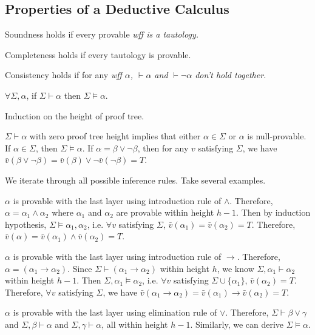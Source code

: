\documentclass{article}
\begin{document}
\QED



\subsection{Properties of a Deductive Calculus}

	Soundness holds if every provable \it{wff} is a tautology.
	
	Completeness holds if every tautology is provable.

	Consistency holds if for any \it{wff} $\alpha$, $\vdash \alpha$ and $\vdash \neg\alpha$ don't hold together.

	$\forall \Sigma, \alpha$, if $\Sigma \vdash \alpha$ then $\Sigma \vDash \alpha$.
	
\Proof
	Induction on the height of proof tree.
	
	 $\Sigma \vdash \alpha$ with zero proof tree height implies that either $\alpha \in \Sigma$ or $\alpha$ is null-provable. If $\alpha \in \Sigma$, then $\Sigma \vDash \alpha$. If $\alpha = \beta \lor \neg\beta$, then for any $v$ satisfying $\Sigma$, we have $\bar{v}(\beta \lor\neg\beta)=\bar{v}(\beta) \lor \neg \bar{v}(\neg\beta) = T$.
	
	 We iterate through all possible inference rules. Take several examples.
	
		 $\alpha$ is provable with the last layer using introduction rule of $\land$. Therefore, $\alpha = \alpha_1 \land \alpha_2$ where $\alpha_1$ and $\alpha_2$ are provable within height $h-1$. Then by induction hypothesis, $\Sigma \vDash \alpha_1, \alpha_2$, i.e. $\forall v$ satisfying $\Sigma$, $\bar{v}(\alpha_1)=\bar{v}(\alpha_2)=T$. Therefore, $\bar{v}(\alpha)=\bar{v}(\alpha_1) \land \bar{v}(\alpha_2)=T$.
		
		 $\alpha$ is provable with the last layer using introduction rule of $\to$. Therefore, $\alpha = (\alpha_1 \to \alpha_2)$. Since $\Sigma \vdash (\alpha_1 \to \alpha_2)$ within height $h$, we know $\Sigma, \alpha_1 \vdash \alpha_2$ within height $h-1$. Then $\Sigma, \alpha_1 \vDash \alpha_2$, i.e. $\forall v$ satisfying $\Sigma \cup \{\alpha_1\}$, $\bar{v}(\alpha_2)=T$. Therefore, $\forall v$ satisfying $\Sigma$, we have $\bar{v}(\alpha_1 \to \alpha_2) = \bar{v}(\alpha_1) \to \bar{v}(\alpha_2) = T$.
		
		 $\alpha$ is provable with the last layer using elimination rule of $\lor$. Therefore, $\Sigma \vdash \beta \lor \gamma$ and $\Sigma, \beta \vdash \alpha$ and $\Sigma, \gamma \vdash \alpha$, all within height $h-1$. Similarly, we can derive $\Sigma \vDash \alpha$.
\end{document}
